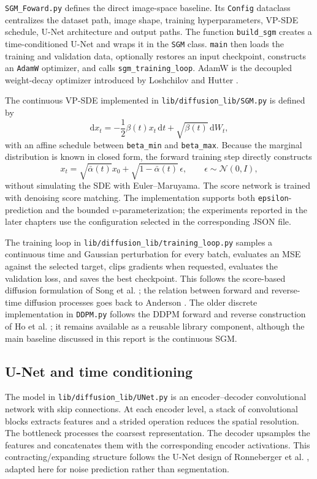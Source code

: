 \lstinline|SGM_Foward.py| defines the direct image-space baseline. Its
\lstinline|Config| dataclass centralizes the dataset path, image shape,
training hyperparameters, VP-SDE schedule, U-Net architecture and output
paths. The function \lstinline|build_sgm| creates a time-conditioned U-Net and
wraps it in the \lstinline|SGM| class. \lstinline|main| then loads the
training and validation data, optionally restores an input checkpoint,
constructs an \lstinline|AdamW| optimizer, and calls
\lstinline|sgm_training_loop|. AdamW is the decoupled weight-decay optimizer
introduced by Loshchilov and Hutter \citep{loshchilov2019adamw}.

The continuous VP-SDE implemented in \lstinline|lib/diffusion_lib/SGM.py| is
defined by
\[
    \mathrm{d}x_t
    = -\frac{1}{2}\beta(t)x_t\,\mathrm{d}t
      + \sqrt{\beta(t)}\,\mathrm{d}W_t,
\]
with an affine schedule between \lstinline|beta_min| and
\lstinline|beta_max|. Because the marginal distribution is known in closed
form, the forward training step directly constructs
\[
    x_t = \sqrt{\bar{\alpha}(t)}x_0
          + \sqrt{1-\bar{\alpha}(t)}\,\epsilon,
    \qquad \epsilon\sim\mathcal{N}(0,I),
\]
without simulating the SDE with Euler--Maruyama. The score network is trained
with denoising score matching. The implementation supports both
\lstinline|epsilon|-prediction and the bounded $v$-parameterization; the
experiments reported in the later chapters use the configuration selected in
the corresponding JSON file.

The training loop in \lstinline|lib/diffusion_lib/training_loop.py| samples a
continuous time and Gaussian perturbation for every batch, evaluates an MSE
against the selected target, clips gradients when requested, evaluates the
validation loss, and saves the best checkpoint. This follows the score-based
diffusion formulation of Song et al. \citep{Song2021SDE}; the relation between
forward and reverse-time diffusion processes goes back to Anderson
\citep{ANDERSON1982313}. The older discrete implementation in
\lstinline|DDPM.py| follows the DDPM forward and reverse construction of Ho et
al. \citep{ho2020ddpm}; it remains available as a reusable library component,
although the main baseline discussed in this report is the continuous SGM.

\subsection{U-Net and time conditioning}

The model in \lstinline|lib/diffusion_lib/UNet.py| is an encoder--decoder
convolutional network with skip connections. At each encoder level, a stack of
convolutional blocks extracts features and a strided operation reduces the
spatial resolution. The bottleneck processes the coarsest representation. The
decoder upsamples the features and concatenates them with the corresponding
encoder activations. This contracting/expanding structure follows the U-Net
design of Ronneberger et al. \citep{ronneberger2015unet}, adapted here for
noise prediction rather than segmentation.


